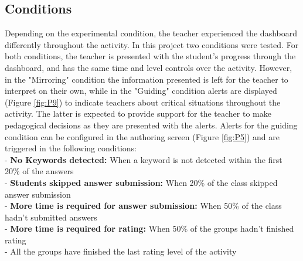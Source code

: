 \subsection{Conditions}
Depending on the experimental condition, the teacher experienced the dashboard differently throughout the activity. In this project two conditions were tested. For both conditions, the teacher is presented with the student's progress through the dashboard, and has the same time and level controls over the activity. However, in the "Mirroring" condition the information presented is left for the teacher to interpret on their own, while in the "Guiding" condition alerts are displayed (Figure \ref{fig:P9}) to indicate teachers about critical situations throughout the activity. The latter is expected to provide support for the teacher to make pedagogical decisions as they are presented with the alerts. Alerts for the guiding condition can be configured in the authoring screen (Figure \ref{fig:P5}) and are triggered in the following conditions:\\
- \textbf{No Keywords detected:} When a keyword is not detected within the first 20\% of the answers\\
- \textbf{Students skipped answer submission:} When 20\% of the class skipped answer submission\\
- \textbf{More time is required for answer submission:} When 50\% of the class hadn’t submitted answers\\
- \textbf{More time is required for rating:} When 50\% of the groups hadn’t finished rating\\
- All the groups have finished the last rating level of the activity\\
